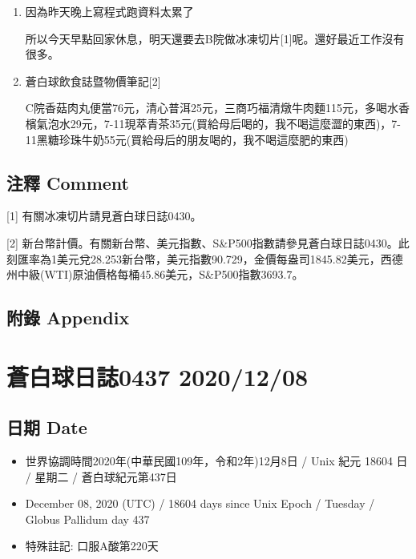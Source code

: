 \documentclass[a5paper, 11pt
]{book}
\providecommand{\tightlist}{%
  \setlength{\itemsep}{0pt}\setlength{\parskip}{0pt}}
\begin{document}
\begin{enumerate}
\def\labelenumi{\arabic{enumi}.}
\item
  因為昨天晚上寫程式跑資料太累了

  所以今天早點回家休息，明天還要去B院做冰凍切片{[}1{]}呢。還好最近工作沒有很多。
\item
  蒼白球飲食誌暨物價筆記{[}2{]}

  C院香菇肉丸便當76元，清心普洱25元，三商巧福清燉牛肉麵115元，多喝水香檳氣泡水29元，7-11現萃青茶35元(買給母后喝的，我不喝這麼澀的東西)，7-11黑糖珍珠牛奶55元(買給母后的朋友喝的，我不喝這麼肥的東西)
\end{enumerate}

\hypertarget{ux6ce8ux91cb-comment-6}{%
\subsection{注釋 Comment}\label{ux6ce8ux91cb-comment-6}}

{[}1{]} 有關冰凍切片請見蒼白球日誌0430。

{[}2{]}
新台幣計價。有關新台幣、美元指數、S\&P500指數請參見蒼白球日誌0430。此刻匯率為1美元兌28.253新台幣，美元指數90.729，金價每盎司1845.82美元，西德州中級(WTI)原油價格每桶45.86美元，S\&P500指數3693.7。

\hypertarget{ux9644ux9304-appendix-6}{%
\subsection{附錄 Appendix}\label{ux9644ux9304-appendix-6}}

\hypertarget{ux84bcux767dux7403ux65e5ux8a8c0437-20201208}{%
\section{蒼白球日誌0437
2020/12/08}\label{ux84bcux767dux7403ux65e5ux8a8c0437-20201208}}

\hypertarget{ux65e5ux671f-date-7}{%
\subsection{日期 Date}\label{ux65e5ux671f-date-7}}

\begin{itemize}
\tightlist
\item
  世界協調時間2020年(中華民國109年，令和2年)12月8日 / Unix 紀元 18604 日
  / 星期二 / 蒼白球紀元第437日
\item
  December 08, 2020 (UTC) / 18604 days since Unix Epoch / Tuesday /
  Globus Pallidum day 437
\item
  特殊註記: 口服A酸第220天
\end{itemize}
\end{document}
